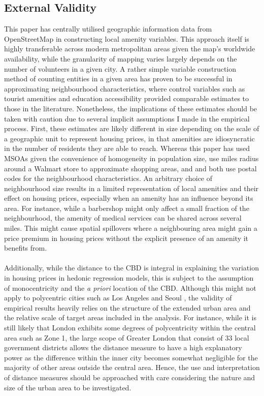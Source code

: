 \documentclass{article}
\begin{document}
\subsection{External Validity}
This paper has centrally utilised geographic information data from OpenStreetMap in constructing local amenity variables. This approach itself is highly transferable across modern metropolitan areas given the map's worldwide availability, while the granularity of mapping varies largely depends on the number of volunteers in a given city. A rather simple variable construction method of counting entities in a given area has proven to be successful in approximating neighbourhood characteristics, where control variables such as tourist amenities and education accessibility provided comparable estimates to those in the literature. Nonetheless, the implications of these estimates should be taken with caution due to several implicit assumptions I made in the empirical process. First, these estimates are likely different in size depending on the scale of a geographic unit to represent housing prices, in that amenities are idiosyncratic in the number of residents they are able to reach. Whereas this paper has used MSOAs given the convenience of homogeneity in population size, \citet{Pope2015WhenAlways} use miles radius around a Walmart store to approximate shopping areas, and \citet{Biagi2015DoesItaly} and \citet{DepartmentforEducation2017HouseMore} both use postal codes for the neighbourhood characteristics. An arbitrary choice of neighbourhood size results in a limited representation of local amenities and their effect on housing prices, especially when an amenity has an influence beyond its area. For instance, while a barbershop might only affect a small fraction of the neighbourhood, the amenity of medical services can be shared across several miles. This might cause spatial spillovers where a neighbouring area might gain  a price premium in housing prices without the explicit presence of an amenity it benefits from.\\\\
Additionally, while the distance to the CBD is integral in explaining the variation in housing prices in hedonic regression models, this is subject to the assumption of monocentricity and the \textit{a priori} location of the CBD. Although this might not apply to polycentric cities such as Los Angeles and Seoul \citep{Park2011SpatialAngeles}, the validity of empirical results heavily relies on the structure of the extended urban area and the relative scale of target areas included in the analysis. For instance, while it is still likely that London exhibits some degrees of polycentricity within the central area such as Zone 1, the large scope of Greater London that consist of 33 local government districts allows the distance measure to have a high explanatory power as the difference within the inner city becomes somewhat negligible for the majority of other areas outside the central area. Hence, the use and interpretation of distance measures should be approached with care considering the nature and size of the urban area to be investigated.
\end{document}
